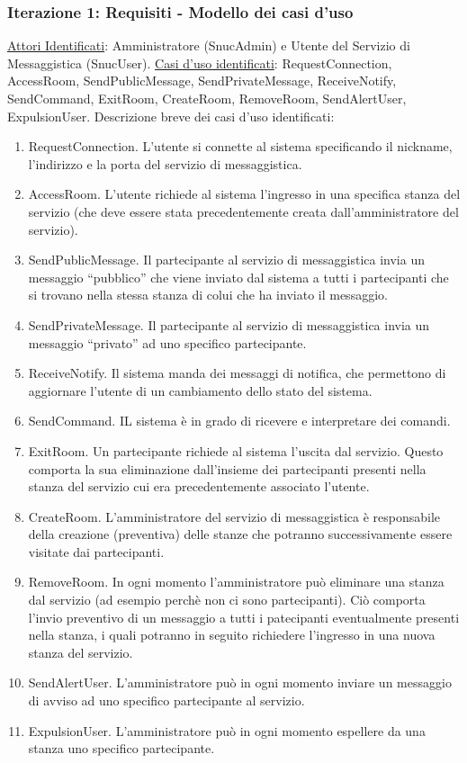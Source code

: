 \documentclass[t]{beamer} %
\let\olditem=\item%
\renewcommand{\item}{\olditem \justifying}%
\begin{document}
\begin{frame} [allowframebreaks]
  \frametitle{Iterazione 1: Requisiti - Modello dei casi d'uso}
   \underline{Attori Identificati}: Amministratore (SnucAdmin) e Utente del Servizio di Messaggistica (SnucUser). \newline
   \underline{Casi d'uso identificati}: RequestConnection, AccessRoom, SendPublicMessage, SendPrivateMessage, ReceiveNotify, SendCommand, ExitRoom, CreateRoom, 
                                        RemoveRoom, SendAlertUser, ExpulsionUser. \newline
   Descrizione breve dei casi d'uso identificati:
   \begin{enumerate} 
    \item RequestConnection. L’utente si connette al sistema specificando il nickname, l’indirizzo e la porta del servizio di messaggistica.
    \item AccessRoom. L’utente richiede al sistema l’ingresso in una specifica stanza del servizio (che deve essere stata precedentemente creata dall’amministratore 
          del servizio). 
    \item SendPublicMessage. Il partecipante al servizio di messaggistica invia un messaggio ``pubblico'' che viene inviato dal sistema a tutti i partecipanti che 
          si trovano nella stessa stanza di colui che ha inviato il messaggio.
    \item SendPrivateMessage. Il partecipante al servizio di messaggistica  invia un messaggio ``privato'' ad uno specifico partecipante.
    \item ReceiveNotify. Il sistema manda dei messaggi di notifica, che permettono di aggiornare l’utente di un cambiamento dello stato del sistema.
    \item SendCommand. IL sistema è in grado di ricevere e interpretare dei comandi.
    \item ExitRoom. Un partecipante richiede al sistema l’uscita dal servizio. Questo comporta la sua eliminazione dall’insieme dei partecipanti presenti nella 
          stanza del servizio cui era precedentemente associato l’utente.
    \item CreateRoom. L’amministratore del servizio di messaggistica è responsabile della creazione (preventiva) delle stanze che potranno successivamente essere 
          visitate dai partecipanti.
    \item RemoveRoom. In ogni momento l’amministratore può eliminare una stanza dal servizio (ad esempio perchè non ci sono partecipanti). Ciò comporta l’invio 
          preventivo di un messaggio a tutti i patecipanti eventualmente presenti nella stanza, i quali potranno in seguito richiedere l’ingresso in una   
          nuova stanza del servizio.
    \item SendAlertUser. L’amministratore può in ogni momento inviare un messaggio di avviso ad uno specifico partecipante al servizio.
    \item ExpulsionUser. L’amministratore può in ogni momento espellere da una stanza uno specifico partecipante.  
   \end{enumerate}
\end{frame}
\end{document}
